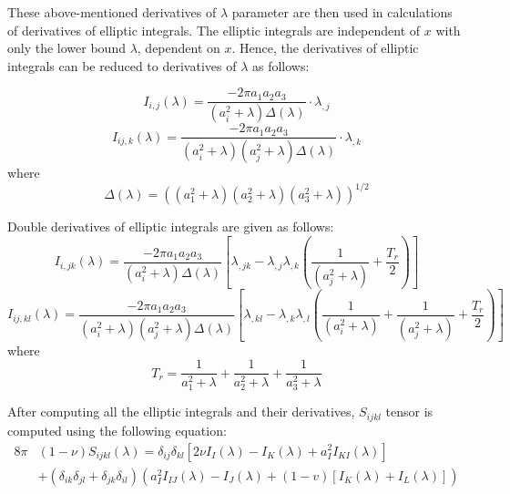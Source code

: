 \documentclass[12pt, a4paper]{report}
\begin{document}
These above-mentioned derivatives of $\lambda$ parameter are then used in calculations of derivatives of elliptic integrals. The elliptic integrals are independent of $x$ with only the lower bound $\lambda$, dependent on $x$. Hence, the derivatives of elliptic integrals can be reduced to derivatives of $\lambda$ as follows:

\begin{equation}
    I_{i,j}(\lambda) = \frac{-2\pi a_1 a_2 a_3}{(a_{i}^{2} + \lambda) \Delta (\lambda)} \cdot \lambda_{,j}
\end{equation}
\begin{equation}
    I_{ij,k}(\lambda) = \frac{-2\pi a_1 a_2 a_3}{(a_{i}^{2} + \lambda)(a_{j}^{2} + \lambda) \Delta (\lambda)} \cdot \lambda_{,k}
\end{equation}
where 
\begin{equation}
    \Delta (\lambda) = \left((a_{1}^{2} + \lambda)(a_{2}^{2} + \lambda)(a_{3}^{2} + \lambda)\right)^{1/2}
\end{equation}

Double derivatives of elliptic integrals are given as follows:
\begin{equation}
    I_{i,jk}(\lambda) = \frac{-2\pi a_1 a_2 a_3}{(a_{i}^{2} + \lambda) \Delta (\lambda)} \left[\lambda_{,jk} - \lambda_{,j}\lambda_{,k}\left(\frac{1}{(a_{j}^{2} + \lambda)} + \frac{T_r}{2} \right)  \right]
\end{equation}
\begin{equation}
    I_{ij,kl}(\lambda) = \frac{-2\pi a_1 a_2 a_3}{(a_{i}^{2} + \lambda)(a_{j}^{2} + \lambda) \Delta (\lambda)} \left[\lambda_{,kl} - \lambda_{,k}\lambda_{,l}\left(\frac{1}{(a_{i}^{2} + \lambda)} + \frac{1}{(a_{j}^{2} + \lambda)} + \frac{T_r}{2} \right)  \right]
\end{equation}
where
\begin{equation}
    T_r = \frac{1}{a_{1}^{2} + \lambda} + \frac{1}{a_{2}^{2} + \lambda} + \frac{1}{a_{3}^{2} + \lambda}
\end{equation}

After computing all the elliptic integrals and their derivatives, $S_{ijkl}$ tensor is computed using the following equation:
\begin{align}
    8\pi &(1-\nu)S_{ijkl}(\lambda) = \delta_{ij}\delta_{kl}\left[2\nu I_{I}(\lambda) - I_{K}(\lambda) + a_{I}^{2} I_{KI}(\lambda) \right] \nonumber \\
    &+ (\delta_{ik}\delta_{jl} + \delta_{jk}\delta_{il})\left(a_{I}^2 I_{IJ}(\lambda) - I_{J}(\lambda) + (1-v)\left[I_{K}(\lambda) + I_{L}(\lambda)  \right]\right)
\end{align}
\end{document}
